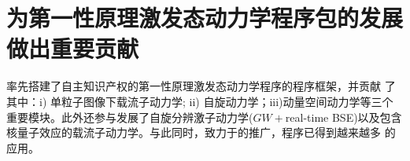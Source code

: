 \section{为第一性原理激发态动力学程序包\hnamd{}的发展做出重要贡献}

\begin{center}
  \begin{InnovationBox}
    率先搭建了自主知识产权的第一性原理激发态动力学程序\hnamd{}的程序框架，并贡献
    了其中：i) 单粒子图像下载流子动力学; ii) 自旋动力学；iii)动量空间动力学等三个
    重要模块。此外还参与发展了自旋分辨激子动力学($GW{}+{}$real-time BSE)以及包含
    核量子效应的载流子动力学。与此同时，致力于\hnamd{}的推广，程序已得到越来越多
    的应用。
  \end{InnovationBox}
\end{center}




